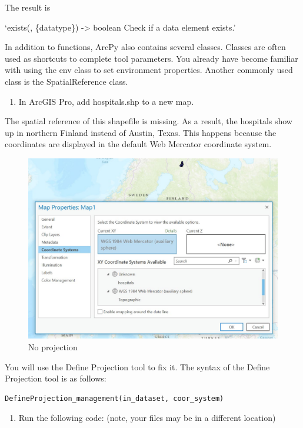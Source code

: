 \documentclass[
]{article}
\providecommand{\tightlist}{%
  \setlength{\itemsep}{0pt}\setlength{\parskip}{0pt}}
\begin{document}
The result is

`exists(, \{datatype\}) -\textgreater{} boolean Check if a data element
exists.'

In addition to functions, ArcPy also contains several classes. Classes
are often used as shortcuts to complete tool parameters. You already
have become familiar with using the env class to set environment
properties. Another commonly used class is the SpatialReference class.

\begin{enumerate}
\def\labelenumi{\arabic{enumi}.}
\setcounter{enumi}{4}
\tightlist
\item
  In ArcGIS Pro, add hospitals.shp to a new map.
\end{enumerate}

The spatial reference of this shapefile is missing. As a result, the
hospitals show up in northern Finland instead of Austin, Texas. This
happens because the coordinates are displayed in the default Web
Mercator coordinate system.

\begin{figure}
\centering
\includegraphics{../images/lab02_noproj.png}
\caption{No projection}
\end{figure}

You will use the Define Projection tool to fix it. The syntax of the
Define Projection tool is as follows:

\begin{verbatim}
DefineProjection_management(in_dataset, coor_system)
\end{verbatim}

\begin{enumerate}
\def\labelenumi{\arabic{enumi}.}
\setcounter{enumi}{5}
\tightlist
\item
  Run the following code: (note, your files may be in a different
  location)
\end{enumerate}
\end{document}
